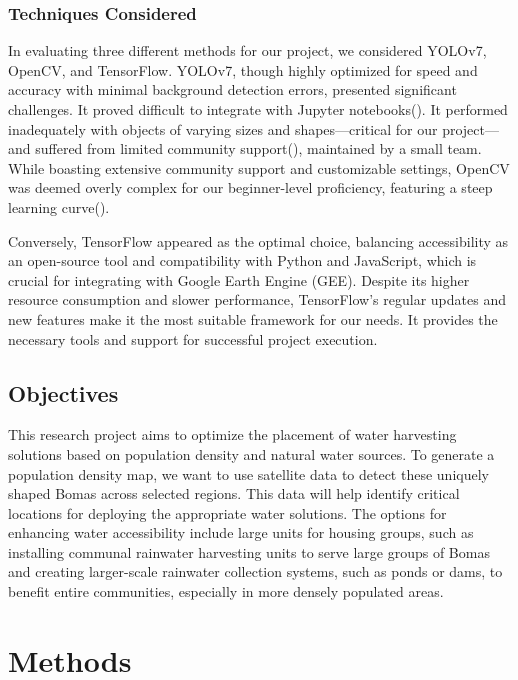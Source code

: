\documentclass[10pt]{article}
\begin{document}
\subsubsection{Techniques Considered}

In evaluating three different methods for our project, we considered YOLOv7, OpenCV, and TensorFlow. YOLOv7, though highly optimized for speed and accuracy with minimal background detection errors, presented significant challenges. It proved difficult to integrate with Jupyter notebooks(\autocite{s23135849}). It performed inadequately with objects of varying sizes and shapes—critical for our project—and suffered from limited community support(\autocite{IJERTV10IS060287}), maintained by a small team. While boasting extensive community support and customizable settings, OpenCV was deemed overly complex for our beginner-level proficiency, featuring a steep learning curve(\autocite{9174593}).

Conversely, TensorFlow appeared as the optimal choice, balancing accessibility as an open-source tool and compatibility with Python and JavaScript, which is crucial for integrating with Google Earth Engine (GEE).
Despite its higher resource consumption and slower performance, TensorFlow's regular updates and new features make it the most suitable framework for our needs. It provides the necessary tools and support for successful project execution.

\subsection{Objectives}

This research project aims to optimize the placement of water harvesting solutions based on population density and natural water sources. To generate a population density map, we want to use satellite data to detect these uniquely shaped Bomas across selected regions. This data will help identify critical locations for deploying the appropriate water solutions. The options for enhancing water accessibility include large units for housing groups, such as installing communal rainwater harvesting units to serve large groups of Bomas and creating larger-scale rainwater collection systems, such as ponds or dams, to benefit entire communities, especially in more densely populated areas.

\section{Methods}
\end{document}
